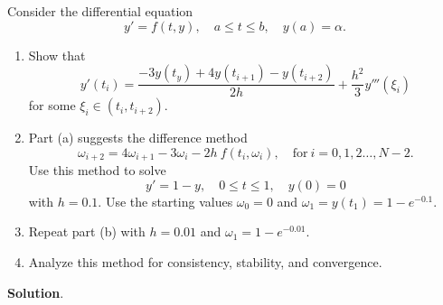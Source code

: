 \documentclass[11pt]{article}
\theoremstyle{break}
\numberwithin{equation}{theorem}
\begin{document}
\newpage
\begin{problem}\label{problem 16} %
    Consider the differential equation $$y'=f(t, y), \quad a\leq t\leq b, \quad y(a)=\alpha.$$
    \begin{enumerate}
        \item Show that $$y'(t_i)=\dfrac{-3y(t_y)+4y(t_{i+1})-y(t_{i+2})}{2h}+\dfrac{h^2}{3}y'''(\xi_i)$$ for some $\xi_i\in(t_i, t_{i+2})$.
        \item Part (a) suggests the difference method $$\omega_{i+2}=4\omega_{i+1}-3\omega_{i}-2h\:f(t_i, \omega_i), \quad\text{for}\ i=0,1,2\dots, N-2.$$ Use this method to solve $$y'=1-y, \quad 0\leq t\leq 1, \quad y(0)=0$$ with $h=0.1$. Use the starting values $\omega_0=0$ and $\omega_1=y(t_1)=1-e^{-0.1}$.
        \item Repeat part (b) with $h=0.01$ and $\omega_1=1-e^{-0.01}$.
        \item Analyze this method for consistency, stability, and convergence.
    \end{enumerate}
\end{problem}
\textbf{Solution}.
\end{document}
